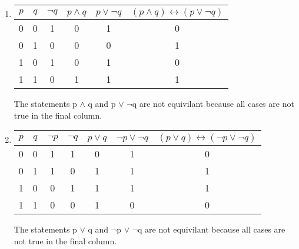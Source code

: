 \documentclass[11pt]{article}
\begin{document}
\begin{enumerate}
\item 
\begin{tabular}{|c|c|c|c|c|c|}
\hline
$p$ & $q$ & $\lnot q$ & $p \land q$ & $p \lor  \lnot q$ & $(p \land q) \leftrightarrow  (p \lor \lnot q)$ \\
\hline
0 & 0 & 1 & 0 & 1 & 0\\
0 & 1 & 0 & 0 & 0 & 1\\		%
1 & 0 & 1 & 0 & 1 & 0\\
1 & 1 & 0 & 1 & 1 & 1\\
\hline
\end{tabular}
\newline
The statements p $\wedge$ q and p $\lor$ $\neg$q are not equivilant because all cases are not true in the final column.

\item
\begin{tabular}{|c|c|c|c|c|c|c|}
\hline
$p$ & $q$ & $\lnot p$ & $\lnot q$ & $p \lor q$ & $\lnot p \lor  \lnot q$ & $(p \lor q) \leftrightarrow  (\lnot p \lor \lnot q)$ \\
\hline
0 & 0 & 1 & 1 & 0 & 1 & 0\\
0 & 1 & 1 & 0 & 1 & 1 & 1\\
1 & 0 & 0 & 1 & 1 & 1 & 1\\
1 & 1 & 0 & 0 & 1 & 0 & 0\\
\hline
\end{tabular}
\newline
The statements p $\lor$ q and $\neg$p $\lor$ $\neg$q are not equivilant because all cases are not true in the final column.


\end{enumerate}
\end{document}
